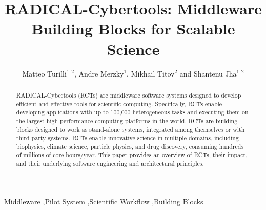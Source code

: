 \documentclass[preprint,12pt, a4paper]{elsarticle}
\begin{document}
\begin{frontmatter}

\title{RADICAL-Cybertools: Middleware Building Blocks for Scalable Science}

\author{Matteo Turilli$^{1,2}$, Andre Merzky$^1$, Mikhail Titov$^2$ and Shantenu Jha$^{1,2}$}
\address{$^1$Electrical \& Computer Engineering, Rutgers University, Piscataway, NJ 08854, USA, $^2$Brookhaven National Laboratory}

\begin{abstract}
RADICAL-Cybertools (RCTs) are middleware software systems designed to develop efficient and effective tools for scientific computing. Specifically, RCTs enable developing applications with up to 100,000 heterogeneous tasks and executing them on the largest high-performance computing platforms in the world. RCTs are building blocks designed to work as stand-alone systems, integrated among themselves or with third-party systems. RCTs enable innovative science in multiple domains, including biophysics, climate science, particle physics, and drug discovery, consuming hundreds of millions of core hours/year. This paper provides an overview of RCTs, their impact, and their underlying software engineering and architectural principles.
\end{abstract}

\begin{keyword}

Middleware \sep Pilot System \sep Scientific Workflow \sep Building Blocks



\end{keyword}

\end{frontmatter}


\end{document}
